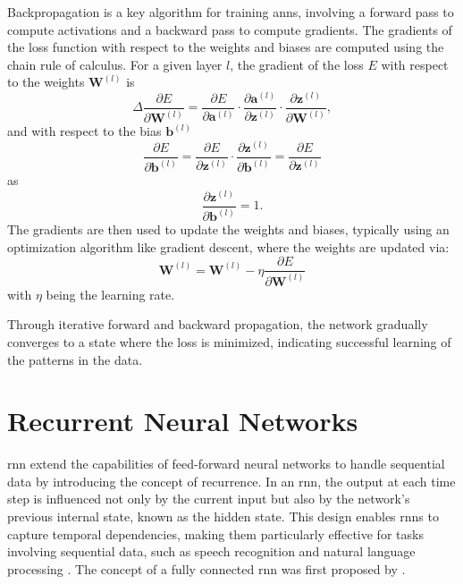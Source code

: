 \documentclass[12pt, a4paper, headinclude, twoside, plainheadsepline, open=right, numbers=noenddot, hidelinks, toc=listof, toc=bibliography]{scrreprt}
\begin{document}
Backpropagation \cite{rumelhartLearningRepresentationsBackpropagating1986} is a key algorithm for training \acp{ann}, involving a forward pass to compute activations and a backward pass to compute gradients. 
The gradients of the loss function with respect to the weights and biases are computed using the chain rule of calculus. For a given layer $l$, the gradient of the loss $E$ with respect to the weights $\mathbf{W}^{(l)}$ is
\begin{equation}
\Delta
\frac{\partial E}{\partial \mathbf{W}^{(l)}} = \frac{\partial E}{\partial \mathbf{a}^{(l)}} \cdot \frac{\partial \mathbf{a}^{(l)}}{\partial \mathbf{z}^{(l)}} \cdot \frac{\partial \mathbf{z}^{(l)}}{\partial \mathbf{W}^{(l)}},
\end{equation}
and with respect to the bias $\mathbf{b}^{(l)}$
\begin{equation}
\frac{\partial E}{\partial \mathbf{b}^{(l)}} = \frac{\partial E}{\partial \mathbf{z}^{(l)}} \cdot \frac{\partial \mathbf{z}^{(l)}}{\partial \mathbf{b}^{(l)}} = \frac{\partial E}{\partial \mathbf{z}^{(l)}}
\end{equation}
as 
\begin{equation}
\frac{\partial \mathbf{z}^{(l)}}{\partial \mathbf{b}^{(l)}} = 1.
\end{equation}
The gradients are then used to update the weights and biases, typically using an optimization algorithm like gradient descent, where the weights are updated via:
\begin{equation}
\mathbf{W}^{(l)} = \mathbf{W}^{(l)} - \eta \frac{\partial E}{\partial \mathbf{W}^{(l)}}
\end{equation}
with $\eta$ being the learning rate.

Through iterative forward and backward propagation, the network gradually converges to a state where the loss is minimized, indicating successful learning of the patterns in the data.

\section{Recurrent Neural Networks}
\label{sec:rnn}

\Ac{rnn} extend the capabilities of feed-forward neural networks to handle sequential data by introducing the concept of recurrence. 
In an \ac{rnn}, the output at each time step is influenced not only by the current input but also by the network's previous internal state, known as the hidden state. 
This design enables \acp{rnn} to capture temporal dependencies, making them particularly effective for tasks involving sequential data, such as speech recognition and natural language processing \cite{lecunDeepLearning2015}.
The concept of a fully connected \ac{rnn} was first proposed by \citeauthor{elmanFindingStructureTime1990} \cite{elmanFindingStructureTime1990}.
\end{document}
